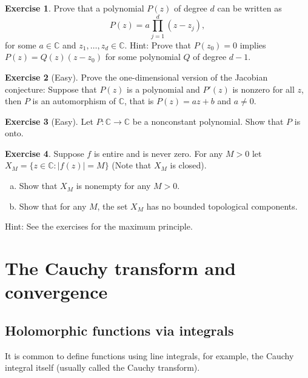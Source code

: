 \documentclass[12pt,openany]{book}
\newcommand{\sabs}[1]{\lvert {#1} \rvert}
\newcommand{\C}{{\mathbb{C}}}
\theoremstyle{plain}
\theoremstyle{remark}
\theoremstyle{definition}
\newenvironment{exbox}{%
    \def\FrameCommand{\vrule width 1pt \relax\hspace{10pt}}%
    \MakeFramed{\advance\hsize-\width\FrameRestore}%
}{%
    \endMakeFramed
}
\newenvironment{exparts}{%
    \leavevmode\begin{enumerate}[a),noitemsep,topsep=0pt,parsep=0pt,partopsep=0pt]
}{%
    \end{enumerate}
}
\theoremstyle{exercise}
\newtheorem{exercise}{Exercise}[section]
\theoremstyle{example}
\begin{document}
\begin{exbox}
\begin{exercise}
Prove that a polynomial $P(z)$ of degree $d$ can be written as
\begin{equation*}
P(z) = a \prod_{j=1}^d (z-z_j) ,
\end{equation*}
for some $a \in \C$ and $z_1,\ldots,z_d \in \C$.
Hint: Prove that $P(z_0) = 0$ implies $P(z) = Q(z) (z-z_0)$ for some
polynomial $Q$ of degree $d-1$.
\end{exercise}

\begin{exercise}[Easy]
Prove the one-dimensional version of the Jacobian conjecture:
Suppose that $P(z)$ is a polynomial and $P'(z)$ is nonzero for all $z$,
then $P$ is an automorphism of $\C$, that is $P(z) = az+b$ and $a \not= 0$.
\end{exercise}

\begin{exercise}[Easy]
Let $P \colon \C \to \C$ be a nonconstant polynomial.  Show that $P$ is
onto.
\end{exercise}

\begin{exercise}
Suppose $f$ is entire and is never zero.  For any $M > 0$ let
$X_M = \bigl\{ z \in \C : \sabs{f(z)} = M \bigr\}$ (Note that $X_M$
is closed).
\begin{exparts}
\item Show that $X_M$ is nonempty for any $M > 0$.
\item Show that for any $M$, the set $X_M$ has no bounded topological components.
\end{exparts}
Hint: See the exercises for the maximum principle.
\end{exercise}
\end{exbox}


\section{The Cauchy transform and convergence}

\subsection{Holomorphic functions via integrals}

It is common to define functions using line integrals, for example,
the Cauchy integral itself (usually called the Cauchy transform).
\end{document}
